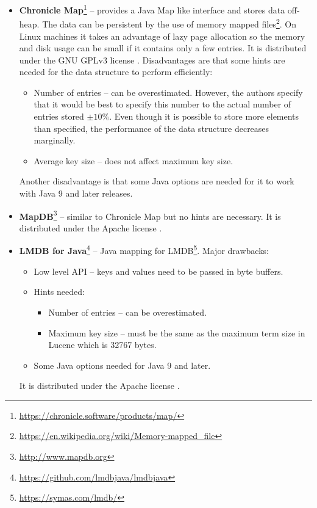 \begin{itemize}
    \item \textbf{Chronicle Map}\footnote{\url{https://chronicle.software/products/map/}} – provides a Java Map like
    interface and stores data off-heap. The data can be persistent by the use of memory mapped
    files\footnote{\url{https://en.wikipedia.org/wiki/Memory-mapped\_file}}. On Linux machines it takes an advantage
    of lazy page allocation so the memory and disk usage can be small if it contains only a few entries.
    It is distributed under the GNU GPLv3 license \citep{gnu}.
    Disadvantages are that some hints are needed for the data structure to perform efficiently:
    \begin{itemize}
        \item Number of entries – can be overestimated. However, the authors specify that it would be best to specify
        this number to the actual number of entries stored $\pm 10\%$. Even though it is possible to store more elements
        than specified, the performance of the data structure decreases marginally.
        \item Average key size – does not affect maximum key size.
    \end{itemize}
    Another disadvantage is that some Java options are needed for it to work with Java 9 and later releases.

    \item \textbf{MapDB}\footnote{\url{http://www.mapdb.org}} – similar to Chronicle Map but no hints are necessary.
    It is distributed under the Apache license \citep{apache}.

    \item \textbf{LMDB for Java}\footnote{\url{https://github.com/lmdbjava/lmdbjava}} – Java mapping for
    LMDB\footnote{\url{https://symas.com/lmdb/}}. Major drawbacks:
    \begin{itemize}
        \item Low level API – keys and values need to be passed in byte buffers.
        \item Hints needed:
            \begin{itemize}
                \item Number of entries – can be overestimated.
                \item Maximum key size – must be the same as the maximum term size in Lucene which is 32767 bytes.
            \end{itemize}
        \item Some Java options needed for Java 9 and later.
    \end{itemize}
    It is distributed under the Apache license \citep{apache}.
\end{itemize}

